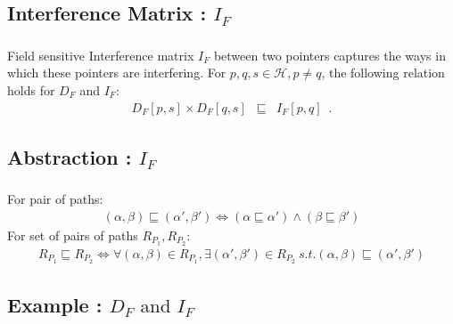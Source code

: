 \documentclass[mathserif,10pt]{beamer}
\newcommand{\cmt}[1]{}
\newcommand{\p}{\ensuremath{p}}
\newcommand{\q}{\ensuremath{q}}
\newcommand{\s}{\ensuremath{s}}
\newcommand{\heap}{\ensuremath{\mathcal{H}}}
\newcommand{\DFM}[2]{\ensuremath{D_F[#1,#2]}}
\newcommand{\IFM}[2]{\ensuremath{I_F[#1,#2]}}
\begin{document}
{\subsection{Interference Matrix : $I_F$}
\frame
{
	\frametitle{\subsecname}
	\cmt{Two pointers $\p,\q \in \heap$ are said to
interfere if there exists $\s \in \heap$ such that both
$\p$ and $\q$ have paths reaching $\s$. Note that $\s$ could
be $\p$ (or $\q$) itself, in which case the path from $\p$
(from $\q$) is $\epsilon$.}

\begin{definition}\label{IFM_matrix}
Field sensitive Interference matrix $I_F$ between
two pointers captures the ways in which these pointers are
interfering.  For $\p, \q, \s \in \heap, \p \not= \q$,
the following relation holds for $D_F$ and $I_F$: 
\begin{eqnarray*}
  \DFM{p}{s} \times \DFM{q}{s} &\sqsubseteq&
  \IFM{p}{q} \enspace . \label {eq:rel-df-if}
\end{eqnarray*}
\end{definition}
}

\subsection{Abstraction : $I_F$}
\frame
{
	\frametitle{\subsecname}
	For pair of paths:
\begin{eqnarray*}
  (\alpha, \beta) \sqsubseteq (\alpha', \beta') 
  \Leftrightarrow 
   (\alpha \sqsubseteq \alpha')  \wedge
  (\beta \sqsubseteq  \beta')
\end{eqnarray*}
For set of pairs of paths $R_{P_1}, R_{P_2}$:
\begin{eqnarray*}
  R_{P_1} \sqsubseteq R_{P_2} \Leftrightarrow \forall
  (\alpha, \beta) \in
  R_{P_1}, \exists (\alpha', \beta') \in
  R_{P_2}\ s.t. (\alpha, \beta) \sqsubseteq (\alpha', \beta')
\end{eqnarray*}
}
}

\subsection{Example : $D_F \mbox{ and } I_F$}
\frame
{
	\frametitle{\subsecname}
	
}	
\end{document}
